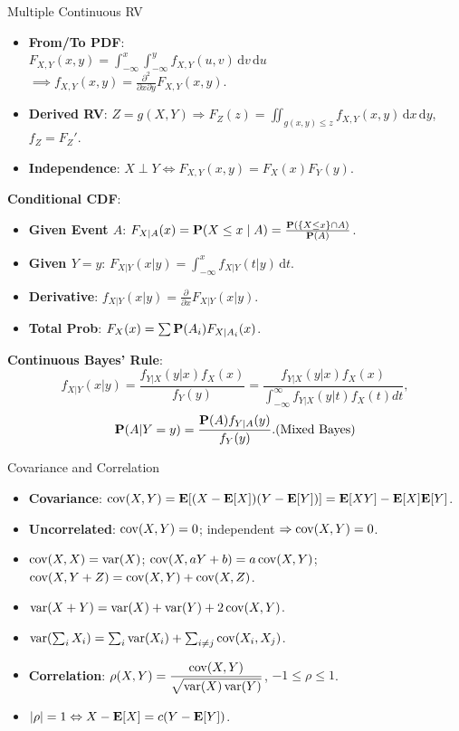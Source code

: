 \documentclass[landscape,a4paper]{article}
\begin{document}
\begin{cheatsheetcolumns}
\begin{card}{Multiple Continuous RV}
\begin{itemize}
				\item \textbf{From/To PDF}:\\$F_{X,Y}(x,y) = \int_{-\infty}^{x} \int_{-\infty}^{y} f_{X,Y}(u,v)\,\mathrm dv\,\mathrm du $\\$\implies f_{X,Y}(x,y) = \frac{\partial^2}{\partial x \partial y} F_{X,Y}(x,y)$.
				\item \textbf{Derived RV}: $Z=g(X,Y)\Rightarrow F_Z(z)=\iint_{g(x,y)\le z}f_{X,Y}(x,y)\,\mathrm dx\,\mathrm dy$, $f_Z=F_Z'$.
				\item \textbf{Independence}: $X \perp Y \iff F_{X,Y}(x,y) = F_X(x)F_Y(y)$.
			\end{itemize}
			
			\textbf{Conditional CDF}: 
			\begin{itemize}
				\item \textbf{Given Event $A$}: $F_{X|A}(x) = \mathbf{P}(X \le x \mid A) = \frac{\mathbf{P}(\{X \le x\} \cap A)}{\mathbf{P}(A)}$.
				\item \textbf{Given $Y=y$}: $F_{X|Y}(x|y) = \int_{-\infty}^{x} f_{X|Y}(t|y) \,\mathrm dt$.
				\item \textbf{Derivative}: $f_{X|Y}(x|y) = \frac{\partial}{\partial x} F_{X|Y}(x|y)$.
				\item \textbf{Total Prob}: $F_X(x) = \sum \mathbf{P}(A_i) F_{X|A_i}(x)$.
			\end{itemize}
			\textbf{Continuous Bayes' Rule}:
			\[
			f_{X | Y}(x | y)=\frac{f_{Y | X}(y | x) f_X(x)}{f_Y(y)}=\frac{f_{Y | X}(y | x) f_X(x)}{\int_{-\infty}^{\infty} f_{Y | X}(y | t) f_X(t) d t},
			\]
			\[\mathbf{P}(A|Y=y) = \frac{\mathbf{P}(A) f_{Y|A}(y)}{f_Y(y)}. (\text{Mixed Bayes})\]
		\end{card}
		\begin{card}{Covariance and Correlation}
			\begin{itemize}
				\item \textbf{Covariance}: $\operatorname{cov}(X,Y)=\mathbf{E}[(X-\mathbf{E}[X])(Y-\mathbf{E}[Y])]=\mathbf{E}[XY]-\mathbf{E}[X]\mathbf{E}[Y]$.
				\item \textbf{Uncorrelated}: $\operatorname{cov}(X,Y)=0$; independent $\Rightarrow\operatorname{cov}(X,Y)=0$.
				\item $\operatorname{cov}(X,X)=\operatorname{var}(X)$; $\operatorname{cov}(X,aY+b)=a\operatorname{cov}(X,Y)$; $\operatorname{cov}(X,Y+Z)=\operatorname{cov}(X,Y)+\operatorname{cov}(X,Z)$.
				\item $\operatorname{var}(X+Y)=\operatorname{var}(X)+\operatorname{var}(Y)+2\operatorname{cov}(X,Y)$.
				\item $\operatorname{var}(\sum_iX_i)=\sum_i\operatorname{var}(X_i)+\sum_{i\neq j}\operatorname{cov}(X_i,X_j)$.
				\item \textbf{Correlation}: $\rho(X,Y)=\dfrac{\operatorname{cov}(X,Y)}{\sqrt{\operatorname{var}(X)\operatorname{var}(Y)}}$, $-1\le\rho\le1$.
				\item $|\rho|=1\Leftrightarrow X-\mathbf{E}[X]=c(Y-\mathbf{E}[Y])$.

\end{itemize}
\end{card}
\end{cheatsheetcolumns}
\end{document}
